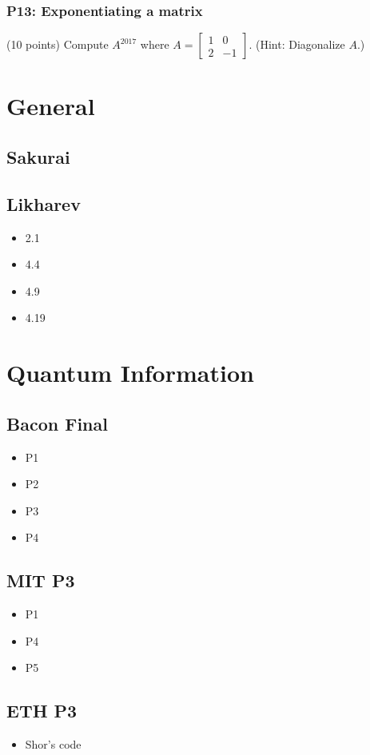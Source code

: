 \documentclass[11pt]{article}
\begin{document}
\subsubsection{P13: Exponentiating a matrix}
\label{sec:orge6b554d}
(10 points) Compute \(A^{2017}\) where \(A=\left[\begin{array}{rr}1 & 0 \\ 2 &
    -1\end{array}\right]\). (Hint: Diagonalize \(A\).)
\section{General}
\label{sec:org0a5e3ab}
\subsection{Sakurai}
\label{sec:org1b35d94}
\subsection{Likharev}
\label{sec:orge08b5c0}
\begin{itemize}
\item 2.1
\item 4.4
\item 4.9
\item 4.19
\end{itemize}
\section{Quantum Information}
\label{sec:org9faf083}
\subsection{Bacon Final}
\label{sec:org868da5d}
\begin{itemize}
\item P1
\item P2
\item P3
\item P4
\end{itemize}
\subsection{MIT P3}
\label{sec:org604be0b}
\begin{itemize}
\item P1
\item P4
\item P5
\end{itemize}
\subsection{ETH P3}
\label{sec:orgbae5696}
\begin{itemize}
\item Shor's code
\end{itemize}
\end{document}
